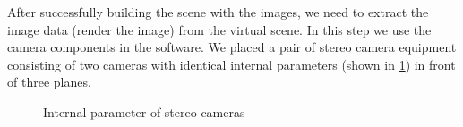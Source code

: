 After successfully building the scene with the images, we need to extract the image data (render the image) from the virtual scene. In this step we use the camera components in the software. We placed a pair of stereo camera equipment consisting of two cameras with identical internal parameters (shown in \cref{fig:Inter-parameter of Stereo Cameras}) in front of three planes. 
\begin{figure}[htbp]
	\centering
	 \quad
	\caption{Internal parameter of stereo cameras}
	\label{fig:Inter-parameter of Stereo Cameras}
\end{figure}

